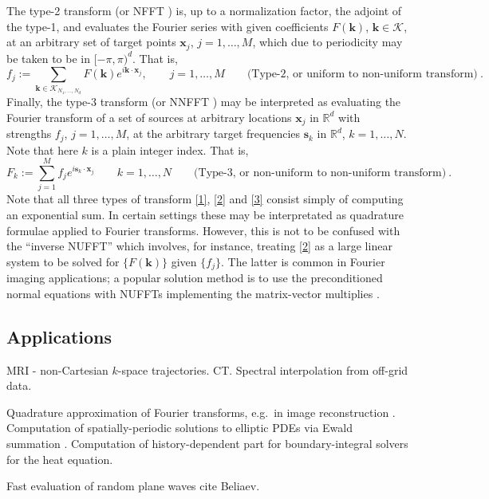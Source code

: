 \documentclass[10pt]{article}
\newcommand{\be}{\begin{equation}}
\newcommand{\ee}{\end{equation}}
\newcommand{\mbf}[1]{{\mathbf #1}}
\newcommand{\RR}{\mathbb{R}}
\newcommand{\xx}{\mbf{x}}
\newcommand{\sss}{\mbf{s}}
\newcommand{\kk}{\mbf{k}}
\newcommand{\KK}{{\mathcal K}}
\newcommand{\NU}{{non-uniform}}
\newcommand{\U}{{uniform}}
\begin{document}
The type-2 transform (or NFFT \cite{usingnfft})
is, up to a normalization factor, the adjoint of the
type-1, and evaluates the Fourier series with given coefficients
$F(\kk)$, $\kk\in\KK$, at an arbitrary set of target points
$\xx_j$, $j=1,\ldots,M$, which due to periodicity may be taken to be in $[-\pi,\pi)^d$.
  That is,
  \be
  f_j := \sum_{\kk\in\KK_{N_1,\dots,N_d}} F(\kk) e^{i \kk\cdot \xx_j},
  \qquad j=1,\dots, M
\qquad \mbox{(Type-2, or \U\ to \NU\ transform)}
~.
\label{2}
\ee
Finally, the type-3 transform
\cite{nufft3} (or NNFFT \cite{usingnfft})
may be interpreted as evaluating the
Fourier transform of a set of sources at arbitrary locations $\xx_j$
in $\RR^d$
with strengths $f_j$, $j=1,\dots, M$, at the arbitrary target frequencies
$\sss_k$ in $\RR^d$, $k=1,\dots, N$. Note that here $k$ is a plain integer
index.
That is,
\be
F_k := \sum_{j=1}^M f_j e^{i \sss_k \cdot \xx_j}
  \qquad k=1,\dots, N
\qquad \mbox{(Type-3, or \NU\ to \NU\ transform)}
~.
\label{3}
\ee
Note that all three types of transform \eqref{1}, \eqref{2} and \eqref{3}
consist simply of computing an exponential sum.
In certain settings these may be interpretated as quadrature formulae
applied to Fourier transforms.
However, this is not to be confused with the ``inverse NUFFT'' which involves,
for instance, treating \eqref{2} as a large linear system to be solved for
$\{F(\kk)\}$ given $\{f_j\}$. The latter is common in Fourier imaging
applications; a popular solution method is to use
the preconditioned normal equations with
NUFFTs implementing the matrix-vector multiplies \cite{fessler,fourmont,fastsinc,gelbrecon}.







\subsection{Applications}

MRI - non-Cartesian $k$-space trajectories.
CT.
Spectral interpolation from off-grid data.

Quadrature approximation of Fourier transforms, e.g.\
in image reconstruction \cite{cryo}.
Computation of spatially-periodic solutions to elliptic
PDEs via Ewald summation
\cite{lindbo11}.
Computation of history-dependent part for boundary-integral solvers
for the heat equation.%

Fast evaluation of random plane waves cite Beliaev.
\end{document}
